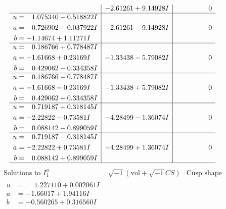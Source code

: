 \documentclass[1p]{elsarticle_modified}
\theoremstyle{definition}
\newcommand{\I}{\sqrt{-1}}
\begin{document}
$$\begin{array}{c|c|c}
 & -2.61261 + 9.14928 I & \phantom{-0.000000 } 0 \\ \hline\begin{aligned}
u &= \phantom{-}1.075340 - 0.518822 I \\
a &= -0.726902 - 0.037922 I \\
b &= -1.14674 + 1.11271 I\end{aligned}
 & -2.61261 - 9.14928 I & \phantom{-0.000000 } 0 \\ \hline\begin{aligned}
u &= \phantom{-}0.186766 + 0.778487 I \\
a &= -1.61668 + 0.23169 I \\
b &= \phantom{-}0.429062 - 0.334358 I\end{aligned}
 & -1.33438 - 5.79082 I & \phantom{-0.000000 } 0 \\ \hline\begin{aligned}
u &= \phantom{-}0.186766 - 0.778487 I \\
a &= -1.61668 - 0.23169 I \\
b &= \phantom{-}0.429062 + 0.334358 I\end{aligned}
 & -1.33438 + 5.79082 I & \phantom{-0.000000 } 0 \\ \hline\begin{aligned}
u &= \phantom{-}0.719187 + 0.318145 I \\
a &= -2.22822 - 0.73581 I \\
b &= \phantom{-}0.088142 - 0.899059 I\end{aligned}
 & -4.28499 - 1.36074 I & \phantom{-0.000000 } 0 \\ \hline\begin{aligned}
u &= \phantom{-}0.719187 - 0.318145 I \\
a &= -2.22822 + 0.73581 I \\
b &= \phantom{-}0.088142 + 0.899059 I\end{aligned}
 & -4.28499 + 1.36074 I & \phantom{-0.000000 } 0\\
 \hline 
 \end{array}$$\newpage$$\begin{array}{c|c|c}  
\text{Solutions to }I^u_{1}& \I (\text{vol} + \sqrt{-1}CS) & \text{Cusp shape}\\
 \hline 
\begin{aligned}
u &= \phantom{-}1.227110 + 0.002061 I \\
a &= -1.66017 + 1.94116 I \\
b &= -0.560265 + 0.316560 I\end{aligned}

\end{array}$$
\end{document}
